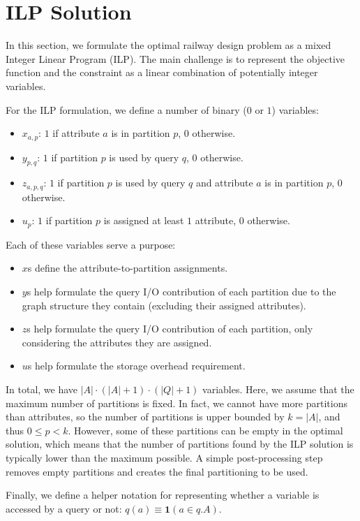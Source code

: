 \section{ILP Solution}\label{sec:ilp}
\noindent
In this section, we formulate the optimal railway design problem as a mixed
Integer Linear Program (ILP). The main challenge is to represent the objective
function and the constraint as a linear combination of potentially integer
variables.

For the ILP formulation, we define a number of binary ($0$ or $1$) variables: 
\begin{itemize}
\item $x_{a,p}$: $1$ if attribute $a$ is in partition $p$, $0$ otherwise.
\item $y_{p,q}$: $1$ if partition $p$ is used by query $q$, $0$ otherwise.
\item $z_{a,p,q}$: $1$ if partition $p$ is used by query $q$ and attribute $a$
is in partition $p$, $0$ otherwise.
\item $u_{p}$: $1$ if partition $p$ is assigned at least $1$ attribute, $0$ otherwise.
\end{itemize}

Each of these variables serve a purpose:
\begin{itemize}
\item $x$s define the attribute-to-partition assignments.
\item $y$s help formulate the query I/O contribution of each partition due to
the graph structure they contain (excluding their assigned attributes).
\item $z$s help formulate the query I/O contribution of each partition, only
considering the attributes they are assigned.
\item $u$s help formulate the storage overhead requirement.
\end{itemize}

In total, we have $|A|\cdot(|A|+1)\cdot(|Q|+1)$ variables. Here, we assume that
the maximum number of partitions is fixed. In fact, we cannot have more
partitions than attributes, so the number of partitions is upper bounded by
$k=|A|$, and thus $0\leq p<k$. However, some of these partitions can be empty
in the optimal solution, which means that the number of partitions found by
the ILP solution is typically lower than the maximum possible. A simple
post-processing step removes empty partitions and creates the final
partitioning to be used. 

Finally, we define a helper notation for representing whether a variable is
accessed by a query or not: $q(a)\equiv \mathbf{1}(a \in q.A)$. 

